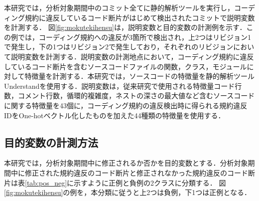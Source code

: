\documentclass[T,J]{fose} %
\begin{document}
本研究では，分析対象期間中のコミット全てに静的解析ツールを実行し，コーディング規約に違反しているコード断片がはじめて検出されたコミットで説明変数を計測する．
図\ref{fig:mokutekihensu}は，説明変数と目的変数の計測例を示す．この例では，コーディング規約への違反が3箇所で検出され，上2つはリビジョン1で発生し，下の1つはリビジョン2で発生しており，それぞれのリビジョンにおいて説明変数を計測する．説明変数の計測地点において，コーディング規約に違反しているコード断片を含むソースコードファイルの関数，クラス，モジュールに対して特徴量を計測する．本研究では，ソースコードの特徴量を静的解析ツールUnderstandを使用する．説明変数は，従来研究で使用される特徴量コード行数，コメント行数，循環的複雑度，ネストの深さの最大値など含むソースコードに関する特徴量を43個に，コーディング規約の違反検出時に得られる規約違反IDをOne-hotベクトル化したものを加えた44種類の特徴量を使用する．

\subsection{目的変数の計測方法}

本研究では，分析対象期間中に修正されるか否かを目的変数とする．分析対象期間中に修正された規約違反のコード断片と修正されなかった規約違反のコード断片は表\ref{tab:pos_neg}に示すように正例と負例の2クラスに分類する．
図\ref{fig:mokutekihensu}の例を，本分類に従うと上2つは負例，下1つは正例となる．

\begin{table}[t]
    \centering
    \caption{正例と負例の分類}
    \label{tab:pos_neg}
\end{table}

\end{document}

